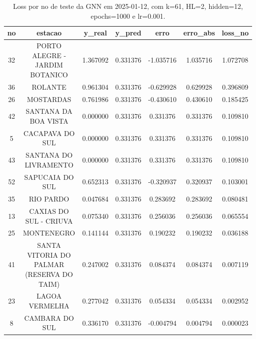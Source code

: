 \begin{table}[h]
\centering
\caption{Loss por no de teste da GNN em 2025-01-12, com k=61, HL=2, hidden=12, epochs=1000 e lr=0.001.}
\label{tab:gnn_loss_k61_hl2_h12_e1000_d20250112}
\begin{tabular}{ccccccc}
\toprule
no & estacao & y\_real & y\_pred & erro & erro\_abs & loss\_no \\
\midrule
32 & PORTO ALEGRE - JARDIM BOTANICO & 1.367092 & 0.331376 & -1.035716 & 1.035716 & 1.072708 \\
36 & ROLANTE & 0.961304 & 0.331376 & -0.629928 & 0.629928 & 0.396809 \\
26 & MOSTARDAS & 0.761986 & 0.331376 & -0.430610 & 0.430610 & 0.185425 \\
42 & SANTANA DA BOA VISTA & 0.000000 & 0.331376 & 0.331376 & 0.331376 & 0.109810 \\
5 & CACAPAVA DO SUL & 0.000000 & 0.331376 & 0.331376 & 0.331376 & 0.109810 \\
43 & SANTANA DO LIVRAMENTO & 0.000000 & 0.331376 & 0.331376 & 0.331376 & 0.109810 \\
52 & SAPUCAIA DO SUL & 0.652313 & 0.331376 & -0.320937 & 0.320937 & 0.103001 \\
35 & RIO PARDO & 0.047684 & 0.331376 & 0.283692 & 0.283692 & 0.080481 \\
13 & CAXIAS DO SUL - CRIUVA & 0.075340 & 0.331376 & 0.256036 & 0.256036 & 0.065554 \\
25 & MONTENEGRO & 0.141144 & 0.331376 & 0.190232 & 0.190232 & 0.036188 \\
41 & SANTA VITORIA DO PALMAR (RESERVA DO TAIM) & 0.247002 & 0.331376 & 0.084374 & 0.084374 & 0.007119 \\
23 & LAGOA VERMELHA & 0.277042 & 0.331376 & 0.054334 & 0.054334 & 0.002952 \\
8 & CAMBARA DO SUL & 0.336170 & 0.331376 & -0.004794 & 0.004794 & 0.000023 \\
\bottomrule
\end{tabular}
\end{table}

